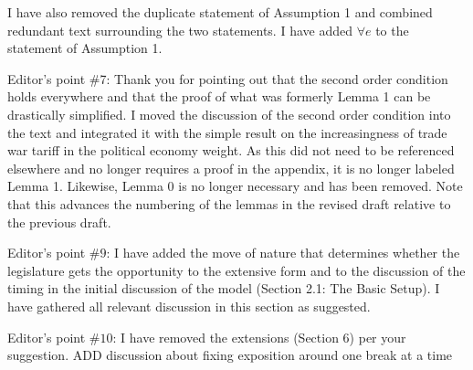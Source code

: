 \documentclass[12pt]{article}
\begin{document}
I have also removed the duplicate statement of Assumption 1 and combined redundant text surrounding the two statements. I have added $\forall e$ to the statement of Assumption 1.

Editor's point $\#$7: Thank you for pointing out that the second order condition holds everywhere and that the proof of what was formerly Lemma 1 can be drastically simplified. I moved the discussion of the second order condition into the text and integrated it with the simple result on the increasingness of trade war tariff in the political economy weight. As this did not need to be referenced elsewhere and no longer requires a proof in the appendix, it is no longer labeled Lemma 1. Likewise, Lemma 0 is no longer necessary and has been removed. Note that this advances the numbering of the lemmas in the revised draft relative to the previous draft. 

Editor's point $\#9$: I have added the move of nature that determines whether the legislature gets the opportunity to the extensive form and to the discussion of the timing in the initial discussion of the model (Section 2.1: The Basic Setup). I have gathered all relevant discussion in this section as suggested.

Editor's point $\#10$: I have removed the extensions (Section 6) per your suggestion. {\color{blue}ADD discussion about fixing exposition around one break at a time}
\end{document}
